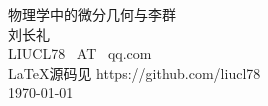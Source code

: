 
\begin{titlepage}
    
\vspace*{10mm}
\begin{center}
    
  {\heiti\Huge{物理学中的微分几何与李群}} \\ [10mm]
  {\large {刘长礼} }\\ [10mm]
  {\large{LIUCL78 {\ AT\ } qq.com }} \\ [10mm]
  
  {\large{\LaTeX 源码见 https://github.com/liucl78 }} \\ [10mm]
  
  {\large {\today}} \\ [10mm]
  

\end{center}

\end{titlepage}

\thispagestyle{empty}

\endinput 